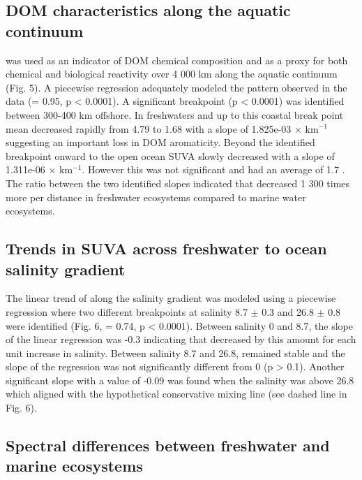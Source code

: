 \subsection*{DOM characteristics along the aquatic continuum}

 was used as an indicator of DOM chemical composition and as a proxy for both chemical and biological reactivity over 4 000 km along the aquatic continuum (Fig. 5). A piecewise regression adequately modeled the pattern observed in the data (\rr = 0.95, p < 0.0001). A significant breakpoint (p < 0.0001) was identified between 300-400 km offshore. In freshwaters and up to this coastal break point mean  decreased rapidly from 4.79 to 1.68 \suvagram with a slope of 1.825e-03 \suvagram $\times$ km$^{-1}$ suggesting an important loss in DOM aromaticity. Beyond the identified breakpoint onward to the open ocean SUVA slowly decreased with a slope of 1.311e-06 \suvagram $\times$ km$^{-1}$. However this was not significant and  had an average of 1.7 \suvagram. The ratio between the two identified slopes indicated that  decreased 1 300 times more per distance in freshwater ecosystems compared to marine water ecosystems.

\subsection*{Trends in SUVA across freshwater to ocean salinity gradient }

The linear trend of  along the salinity gradient was modeled using a piecewise regression where two different breakpoints at salinity 8.7 $\pm$ 0.3 and 26.8 $\pm$ 0.8 were identified (Fig. 6, \rr = 0.74, p < 0.0001). Between salinity 0 and 8.7, the slope of the linear regression was -0.3 indicating that  decreased by this amount for each unit increase in salinity. Between salinity 8.7 and 26.8,  remained stable and the slope of the regression was not significantly different from 0 (p > 0.1). Another significant slope with a value of -0.09 was found when the salinity was above 26.8 which aligned with the hypothetical conservative mixing line (see dashed line in Fig. 6).

\subsection*{Spectral differences between freshwater and marine ecosystems}

